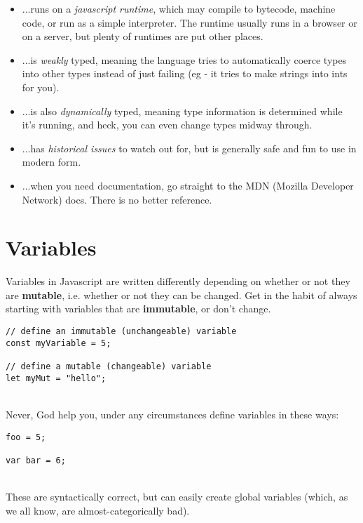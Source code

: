 \documentclass{article}
\begin{document}
\begin{itemize}
	\item ...runs on a \textit{javascript runtime}, which may compile to bytecode, machine code, or run as a simple interpreter. The runtime usually runs in a browser or on a server, but plenty of runtimes are put other places.
	\item ...is \textit{weakly} typed, meaning the language tries to automatically coerce types into other types instead of just failing (eg - it tries to make strings into ints for you).
	\item ...is also \textit{dynamically} typed, meaning type information is determined while it's running, and heck, you can even change types midway through.
	\item ...has \textit{historical issues} to watch out for, but is generally safe and fun to use in modern form.
	\item ...when you need documentation, go straight to the MDN (Mozilla Developer Network) docs. There is no better reference.
\end{itemize}

\section{Variables}

Variables in Javascript are written differently depending on whether or not they are \textbf{mutable}, i.e. whether or not they can be changed. Get in the habit of always starting with variables that are \textbf{immutable}, or don't change.
\\
\begin{lstlisting}
// define an immutable (unchangeable) variable
const myVariable = 5;

// define a mutable (changeable) variable
let myMut = "hello";
\end{lstlisting}

\noindent
\\
Never, God help you, under any circumstances define variables in these ways:
\\
\begin{lstlisting}
foo = 5;

var bar = 6;
\end{lstlisting}

\noindent
\\
These are syntactically correct, but can easily create global variables (which, as we all know, are almost-categorically bad).
\end{document}
